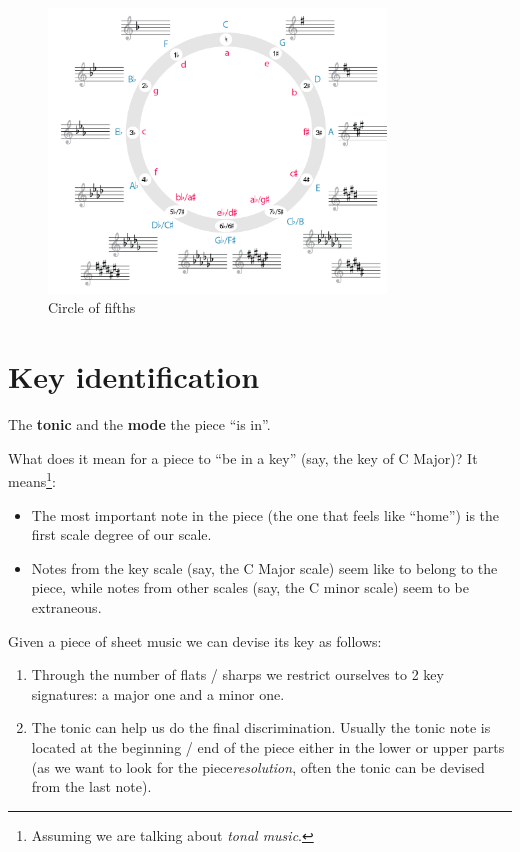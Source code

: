\begin{figure}
    \begin{center}
        \includegraphics[width=0.8\textwidth]{img/circle}
        \caption{Circle of fifths}
    \end{center}
\end{figure}

\section{Key identification}
\begin{definition}
    The \textbf{tonic} and the \textbf{mode} the piece ``is in''.
\end{definition}

What does it mean for a piece to ``be in a key'' (say, the key of C Major)? It means\footnote{Assuming we are talking about \emph{tonal music}.}:
\begin{itemize}
    \item The most important note in the piece (the one that feels like ``home'') is the first scale degree of our scale.
    \item Notes from the key scale (say, the C Major scale) seem like to belong to the piece, while notes from other scales (say, the C minor scale) seem to be extraneous.
\end{itemize}

Given a piece of sheet music we can devise its key as follows:
\begin{enumerate}
    \item Through the number of flats / sharps we restrict ourselves to 2 key signatures: a major one and a minor one.
    \item The tonic can help us do the final discrimination. Usually the tonic note is located at the beginning / end of the piece either in the lower or upper parts (as we want to look for the piece\emph{resolution}, often the tonic can be devised from the last note).
\end{enumerate}

